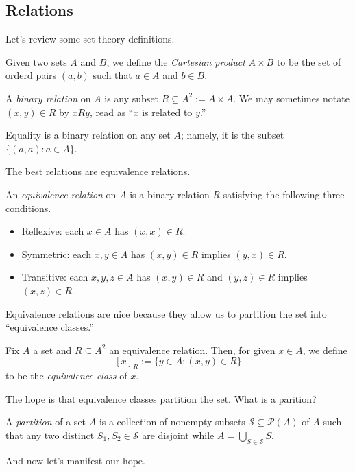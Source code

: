\subsection{Relations}
Let's review some set theory definitions.
\begin{definition}
	Given two sets $A$ and $B$, we define the \textit{Cartesian product} $A\times B$ to be the set of orderd pairs $(a,b)$ such that $a\in A$ and $b\in B$.
\end{definition}
\begin{definition}
	A \textit{binary relation} on $A$ is any subset $R\subseteq A^2:=A\times A$. We may sometimes notate $(x,y)\in R$ by $xRy$, read as ``$x$ is related to $y$.''
\end{definition}
\begin{example}
	Equality is a binary relation on any set $A$; namely, it is the subset $\{(a,a):a\in A\}$.
\end{example}
The best relations are equivalence relations.
\begin{definition}
	An \textit{equivalence relation} on $A$ is a binary relation $R$ satisfying the following three conditions.
	\begin{itemize}
		\item Reflexive: each $x\in A$ has $(x,x)\in R$.
		\item Symmetric: each $x,y\in A$ has $(x,y)\in R$ implies $(y,x)\in R$.
		\item Transitive: each $x,y,z\in A$ has $(x,y)\in R$ and $(y,z)\in R$ implies $(x,z)\in R$.
	\end{itemize}
\end{definition}
Equivalence relations are nice because they allow us to partition the set into ``equivalence classes.''
\begin{defi}
	Fix $A$ a set and $R\subseteq A^2$ an equivalence relation. Then, for given $x\in A$, we define
	\[[x]_R:=\{y\in A:(x,y)\in R\}\]
	to be the \textit{equivalence class} of $x$.
\end{defi}
The hope is that equivalence classes partition the set. What is a parition?
\begin{definition}[Parition]
	A \textit{partition} of a set $A$ is a collection of nonempty subsets $\mathcal S\subseteq\mathcal P(A)$ of $A$ such that any two distinct $S_1,S_2\in\mathcal S$ are disjoint while $A=\bigcup_{S\in\mathcal S}S$.
\end{definition}
And now let's manifest our hope.
